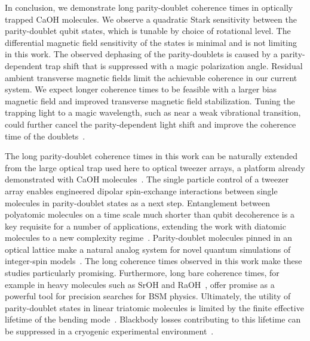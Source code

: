 \documentclass[
superscriptaddress,
twocolumn,
amsmath,amssymb,
aps,
prx,
nofootinbib,
]{revtex4-2}
\begin{document}
In conclusion, we demonstrate long parity-doublet coherence times in optically trapped CaOH molecules. We observe a quadratic Stark sensitivity between the parity-doublet qubit states, which is tunable by choice of rotational level. The differential magnetic field sensitivity of the states is minimal and is not limiting in this work. The observed dephasing of the parity-doublets is caused by a parity-dependent trap shift that is suppressed with a magic polarization angle. Residual ambient transverse magnetic fields limit the achievable coherence in our current system. We expect longer coherence times to be feasible with a larger bias magnetic field and improved transverse magnetic field stabilization. Tuning the trapping light to a magic wavelength, such as near a weak vibrational transition, could further cancel the parity-dependent light shift and improve the coherence time of the doublets~\cite{Bause2020tuneout, guan2021magic, Gregory2024}.



The long parity-doublet coherence times in this work can be naturally extended from the large optical trap used here to optical tweezer arrays, a platform already demonstrated with CaOH molecules~\cite{VilasOpticalTweezer2024}. The single particle control of a tweezer array enables engineered dipolar spin-exchange interactions between single molecules in parity-doublet states as a next step. Entanglement between polyatomic molecules on a time scale much shorter than qubit decoherence is a key requisite for a number of applications, extending the work with diatomic molecules to a new complexity regime~\cite{holland2023demand,bao2023dipolar,picard2025entanglement,ruttley2025long}. Parity-doublet molecules pinned in an optical lattice make a natural analog system for novel quantum simulations of integer-spin models~\cite{Wall2013}. The long coherence times observed in this work make these studies particularly promising. Furthermore, long bare coherence times, for example in heavy molecules such as SrOH and RaOH~\cite{kozyryev2017PolyEDM,Norrgard2019,kozyryev2021enhanced,zhang2023relativistic,Arrowsmith-Kron2024opportunities}, offer promise as a powerful tool for precision searches for BSM physics. Ultimately, the utility of parity-doublet states in linear triatomic molecules is limited by the finite effective lifetime of the bending mode~\cite{hallas2022optical, vilas2023blackbody}. Blackbody losses contributing to this lifetime can be suppressed in a cryogenic experimental environment~\cite{zhang2025high}.
\end{document}
